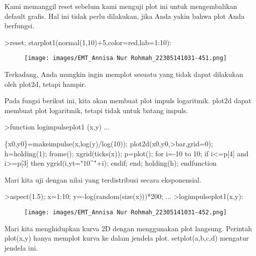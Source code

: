 \documentclass[a4paper,10pt]{article}
\begin{document}
\begin{eulernotebook}
\begin{eulercomment}
Kami memanggil reset sebelum kami menguji plot ini untuk mengembalikan
default grafis. Hal ini tidak perlu dilakukan, jika Anda yakin bahwa
plot Anda berfungsi.
\end{eulercomment}
\begin{eulerprompt}
>reset; starplot1(normal(1,10)+5,color=red,lab=1:10):
\end{eulerprompt}
\begin{figure}[h]
    \centering
    \texttt{[image: images/EMT\_Annisa Nur Rohmah\_22305141031-451.png]}
\end{figure}
\begin{eulercomment}
Terkadang, Anda mungkin ingin memplot sesuatu yang tidak dapat
dilakukan oleh plot2d, tetapi hampir.

Pada fungsi berikut ini, kita akan membuat plot impuls logaritmik.
plot2d dapat membuat plot logaritmik, tetapi tidak untuk batang
impuls.
\end{eulercomment}
\begin{eulerprompt}
>function logimpulseplot1 (x,y) ...
\end{eulerprompt}
\begin{eulerudf}
    \{x0,y0\}=makeimpulse(x,log(y)/log(10));
    plot2d(x0,y0,>bar,grid=0);
    h=holding(1);
    frame();
    xgrid(ticks(x));
    p=plot();
    for i=-10 to 10;
      if i<=p[4] and i>=p[3] then
         ygrid(i,yt="10^"+i);
      endif;
    end;
    holding(h);
  endfunction
\end{eulerudf}
\begin{eulercomment}
Mari kita uji dengan nilai yang terdistribusi secara eksponensial.
\end{eulercomment}
\begin{eulerprompt}
>aspect(1.5); x=1:10; y=-log(random(size(x)))*200; ...
>logimpulseplot1(x,y):
\end{eulerprompt}
\begin{figure}[h]
    \centering
    \texttt{[image: images/EMT\_Annisa Nur Rohmah\_22305141031-452.png]}
\end{figure}
\begin{eulercomment}
Mari kita menghidupkan kurva 2D dengan menggunakan plot langsung.
Perintah plot(x,y) hanya memplot kurva ke dalam jendela plot.
setplot(a,b,c,d) mengatur jendela ini.


\end{eulercomment}
\end{eulernotebook}
\end{document}
